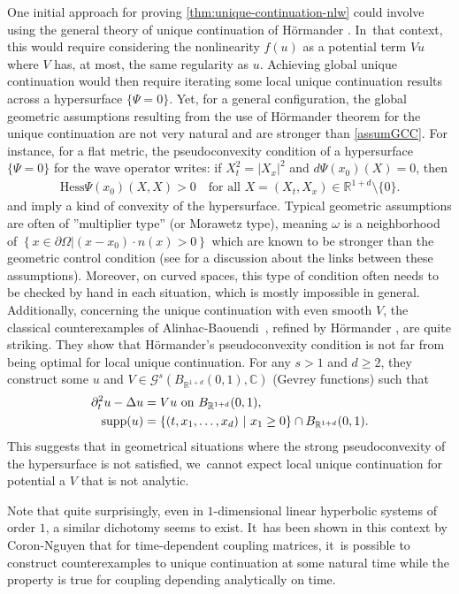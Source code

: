 \documentclass[JEP,XML,SOM,Unicode,published]{cedram}
\DeclareMathOperator{\supp}{\mathrm{supp}}
\theoremstyle{definition}
\newcommand{\R}{\mathbb{R}}
\begin{document}
One initial approach for proving \cref{thm:unique-continuation-nlw} could involve using the general theory of unique continuation of Hörmander \cite{H:63}. In~that context, this would require considering the nonlinearity $f(u)$ as a potential term $Vu$ where $V$ has, at most, the same regularity as $u$. Achieving global unique continuation would then require iterating some local unique continuation results across a hypersurface $\{\Psi=0\}$. Yet, for a general configuration, the global geometric assumptions resulting from the use of Hörmander theorem for the unique continuation are not very natural and are stronger than \ref{assumGCC}. For instance, for a flat metric, the pseudoconvexity condition of a hypersurface $\{\Psi=0\}$ for the wave operator writes: if $X_{t}^{2}=|X_{x}|^{2}$ and $d\Psi(x_0)(X)=0$, then
\begin{align*}
\text{Hess} \Psi(x_0) (X , X) >0 \quad \text{for all } X=(X_{t},X_{x}) \in \R^{1+d} \setminus \{0\}.
\end{align*}
and imply a kind of convexity of the hypersurface. Typical geometric assumptions are often of ''multiplier type'' (or Morawetz type), meaning $\omega$ is a neighborhood of $\left\{x\in \partial\Omega \left|(x-x_0)\cdot n(x)>0\right.\right\}$ which are known to be stronger than the geometric control condition (see \cite{M:03} for a discussion about the links between these assumptions). Moreover, on curved spaces, this type of condition often needs to be checked by hand in each situation, which is mostly impossible in general. Additionally, concerning the unique continuation with even smooth $V$, the classical counterexamples of Alinhac-Baouendi~\cite{AB:95}, refined by Hörmander \cite{H:00}, are quite striking. They show that Hörmander's pseudoconvexity condition is not far from being optimal for local unique continuation. For any $s>1$ and $d\geq 2$, they construct some $u$ and $V \in \mathcal{G}^s(B_{\R^{1+d}}(0,1), \mathbb{C})$ (Gevrey functions) such that
\begin{align*}
\partial_{t}^{2}u-\Delta u&=V u \textnormal{ on }B_{\R^{1+d}}(0,1),\\
\supp(u)&=\left\{(t,x_{1},\dots, x_{d})\ |\ x_{1}\geq 0\right\}\cap B_{\R^{1+d}}(0,1).
\end{align*}
This suggests that in geometrical situations where the strong pseudoconvexity of the hypersurface is not satisfied, we~cannot expect local unique continuation for potential a $V$ that is not analytic.

Note that quite surprisingly, even in $1$-dimensional linear hyperbolic systems of order $1$, a similar dichotomy seems to exist. It~has been shown in this context by Coron-Nguyen \cite{CN:21} that for time-dependent coupling matrices, it~is possible to construct counterexamples to unique continuation at some natural time while the property is true for coupling depending analytically on time.
\end{document}
